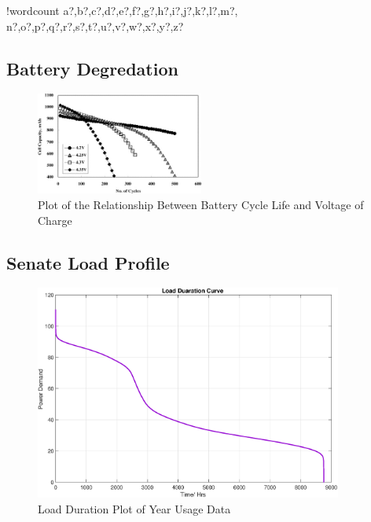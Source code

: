 \documentclass[fontsize=9.5pt]{extarticle}
\numberwithin{figure}{section} %
\newcounter{words}
\newenvironment{counted}{%
  \setcounter{words}{0}
  \SearchList!{wordcount}{\stepcounter{words}}
    {a?,b?,c?,d?,e?,f?,g?,h?,i?,j?,k?,l?,m?,
    n?,o?,p?,q?,r?,s?,t?,u?,v?,w?,x?,y?,z?}
  \UndoBoundary{'}
  \SearchOrder{p;}}{%
  \StopSearching}
\begin{document}
\begin{counted}
\begin{landscape}
 \end{landscape}\newpage

\subsection{Battery Degredation}\label{battery-degredation}

\begin{figure}
   \vspace{-20pt}
  \begin{center}
  \includegraphics[trim = 0 0 0 0, clip, width=0.49\textwidth]{capVol.jpeg}
  \end{center}
  \caption{Plot of the Relationship Between Battery Cycle Life and Voltage of Charge \cite{Choi2002130} }
  \vspace{-20pt}
\label{capVol}
\end{figure}

\subsection{Senate Load Profile}\label{senate-load-profile}

\begin{figure}[H]
  \begin{center}
    \vspace{-20pt}
   \includegraphics[trim = 0 0 0 0, clip, width=0.9\textwidth]{loadprofile.eps}
  \end{center}
  \caption{Load Duration Plot of Year Usage Data}
  \label{loadprofile}
\end{figure}


\end{counted}
\end{document}
